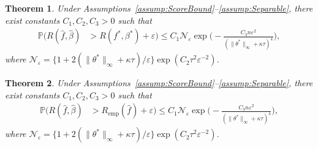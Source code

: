 \documentclass[twoside, onecolumn]{article}
\newtheorem{theorem}{Theorem}
\newtheorem{remark}{Remark}
\begin{document}







\begin{theorem}\label{thm:EstErrorProbBound}
Under Assumptions~\ref{assump:ScoreBound}--\ref{assump:Separable}, there exist constants $C_1, C_2, C_3>0$ such that
\begin{align*}
\mathbb{P}\Big(R(\widehat f, \widehat \beta)&>R(f^*,\beta^*)+\varepsilon 
\Big)\leq C_{1}\mathcal{N}_{\varepsilon}\exp\Big(-\frac{C_3n \varepsilon^2}{(\|\theta^*\|_\infty+\kappa\tau)^4}\Big),
\end{align*}
where $\mathcal{N}_{\varepsilon}=\{1+2(\|\theta^*\|_\infty+\kappa\tau)/\varepsilon\}\exp( C_2\tau^2 \varepsilon^{-2})$.
\end{theorem}

\begin{theorem}\label{thm:EmpRiskProbBound}
Under Assumptions~\ref{assump:ScoreBound}--\ref{assump:Separable}, there exist constants $C_1, C_2, C_3>0$ such that
\begin{align*}
\mathbb{P}\bigg(R(\widehat f, \widehat \beta) &> R_{\text{emp}}(\widehat f) +\varepsilon \bigg)\leq  C_1 \mathcal{N}_{\varepsilon}\exp\Big(-\frac{C_3n \varepsilon^2}{(\|\theta^*\|_\infty+\kappa\tau)^4}\Big),
\end{align*}
where $\mathcal{N}_{\varepsilon}=\{1+2(\|\theta^*\|_\infty+\kappa\tau)/\varepsilon \}\exp( C_2\tau^2 \varepsilon^{-2})$.
\end{theorem}
\end{document}
